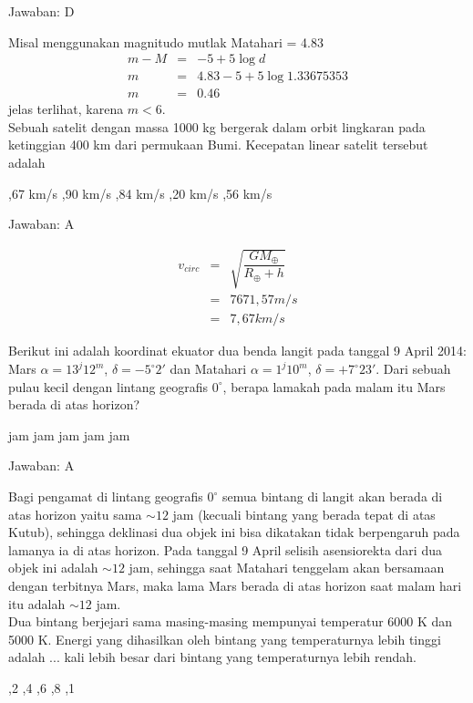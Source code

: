 \documentclass[11pt,fleqn]{exam}
\begin{document}
\begin{questions}
Jawaban: D

Misal menggunakan magnitudo mutlak Matahari = 4.83
\begin{eqnarray*}
m - M &=& -5 + 5 \log d \\
m &=& 4.83 - 5 + 5 \log 1.33675353\\
m &=& 0.46  
\end{eqnarray*}
jelas terlihat, karena $m < 6$.\\


\question Sebuah satelit dengan massa 1000 kg bergerak dalam orbit lingkaran pada ketinggian 400 km dari permukaan Bumi. Kecepatan linear satelit tersebut adalah
\begin{choices}
,67 km/s
,90 km/s
,84 km/s
,20 km/s
,56 km/s
\end{choices}

Jawaban: A

\begin{eqnarray*}
v_{circ}&=&\sqrt{\dfrac{GM_{\oplus}}{R_{\oplus}+h}}\\
&=&7671,57 m/s\\
&=&7,67 km/s
\end{eqnarray*}


\question Berikut ini adalah koordinat ekuator dua benda langit pada tanggal 9 April 2014: Mars $\alpha = 13^{j}12^{m}$, $\delta = -5^{\circ}2'$ dan Matahari $\alpha = 1^{j}10^{m}$, $\delta = +7^{\circ}23'$. Dari sebuah pulau kecil dengan lintang geografis $0^{\circ}$, berapa lamakah pada malam itu Mars berada di atas horizon?
\begin{choices}
 jam
 jam
 jam
 jam
 jam
\end{choices}

Jawaban: A

Bagi pengamat di lintang geografis $0^{\circ}$ semua bintang di langit akan berada di atas horizon yaitu sama $\sim 12$ jam (kecuali bintang yang berada tepat di atas Kutub), sehingga deklinasi dua objek ini bisa dikatakan tidak berpengaruh pada lamanya ia di atas horizon. Pada tanggal 9 April selisih asensiorekta dari dua objek ini adalah $\sim 12$ jam, sehingga saat Matahari tenggelam akan bersamaan dengan terbitnya Mars, maka lama Mars berada di atas horizon saat malam hari itu adalah $\sim 12$ jam.\\


\question Dua bintang berjejari sama masing-masing mempunyai temperatur 6000 K dan 5000 K. Energi yang dihasilkan oleh bintang yang temperaturnya lebih tinggi adalah ... kali lebih besar dari bintang yang temperaturnya lebih rendah.
\begin{choices}
,2
,4
,6
,8
,1
\end{choices}


\end{questions}
\end{document}
